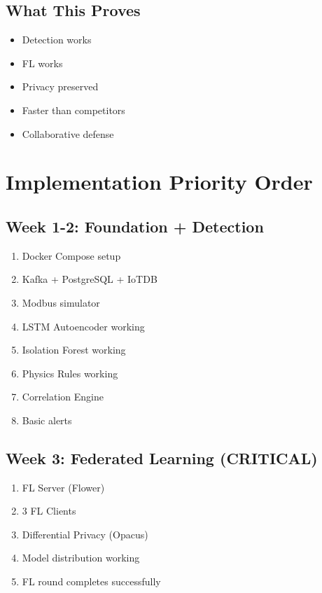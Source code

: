 \documentclass[11pt,a4paper]{article}
\begin{document}
\subsection{What This Proves}

\begin{itemize}[leftmargin=*]
    \item Detection works
    \item FL works
    \item Privacy preserved
    \item Faster than competitors
    \item Collaborative defense
\end{itemize}

\section{Implementation Priority Order}

\subsection{Week 1-2: Foundation + Detection}

\begin{enumerate}[leftmargin=*]
    \item Docker Compose setup
    \item Kafka + PostgreSQL + IoTDB
    \item Modbus simulator
    \item LSTM Autoencoder working
    \item Isolation Forest working
    \item Physics Rules working
    \item Correlation Engine
    \item Basic alerts
\end{enumerate}

\subsection{Week 3: Federated Learning (CRITICAL)}

\begin{enumerate}[leftmargin=*]
    \item FL Server (Flower)
    \item 3 FL Clients
    \item Differential Privacy (Opacus)
    \item Model distribution working
    \item FL round completes successfully
\end{enumerate}
\end{document}
